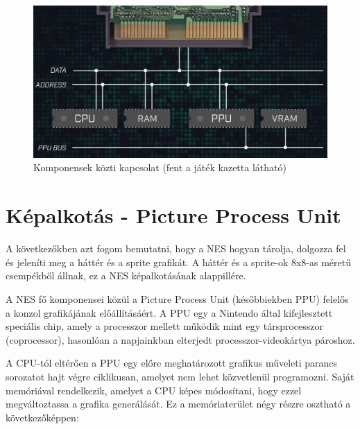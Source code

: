 	\begin{figure}[H]
		\centering
		\includegraphics[width=120mm, keepaspectratio]{figures/NES-databuses}
		\caption{Komponensek közti kapcsolat (fent a játék kazetta látható) \cite{NES_hardware}}
		\label{fig:NES-Data-Buses}
	\end{figure}
	

\section{Képalkotás - Picture Process Unit}
\label{PPU-irodalom}

A következőkben azt fogom bemutatni, hogy a NES hogyan tárolja, dolgozza fel és jeleníti meg a háttér és a sprite grafikát. A háttér és a sprite-ok 8x8-as méretű csempékből állnak, ez a NES képalkotásának alappillére.

A NES fő komponensei közül a Picture Process Unit (későbbiekben PPU) felelős a konzol grafikájának előállításáért. A PPU egy a Nintendo által kifejlesztett speciális chip, amely a processzor mellett működik mint egy társprocesszor (coprocessor), hasonlóan a napjainkban elterjedt processzor-videokártya pároshoz.

A CPU-tól eltérően a PPU egy előre meghatározott grafikus műveleti parancs sorozatot hajt végre ciklikusan, amelyet nem lehet közvetlenül programozni. Saját memóriával rendelkezik,
amelyet a CPU képes módosítani, hogy ezzel megváltoztassa a grafika generálását. Ez a memóriaterület négy részre osztható a következőképpen:


